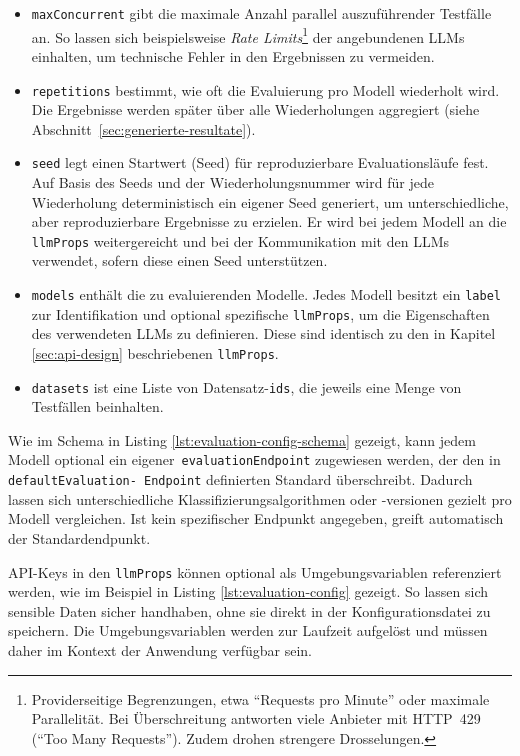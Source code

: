 \begin{itemize}
    \item \texttt{maxConcurrent} gibt die maximale Anzahl parallel auszuführender Testfälle an. So lassen sich beispielsweise \emph{Rate Limits}\footnote{Providerseitige Begrenzungen, etwa \enquote{Requests pro Minute} oder maximale Parallelität. Bei Überschreitung antworten viele Anbieter mit HTTP~429 (\enquote{Too Many Requests}). Zudem drohen strengere Drosselungen.} der angebundenen \acp{LLM} einhalten, um technische Fehler in den Ergebnissen zu vermeiden.
    \item \texttt{repetitions} bestimmt, wie oft die Evaluierung pro Modell wiederholt wird. Die Ergebnisse werden später über alle Wiederholungen aggregiert (siehe Abschnitt~\ref{sec:generierte-resultate}).
    \item \texttt{seed} legt einen Startwert (Seed) für reproduzierbare Evaluationsläufe fest. Auf Basis des Seeds und der Wiederholungsnummer wird für jede Wiederholung deterministisch ein eigener Seed generiert, um unterschiedliche, aber reproduzierbare Ergebnisse zu erzielen. Er wird bei jedem Modell an die \texttt{llmProps} weitergereicht und bei der Kommunikation mit den \acp{LLM} verwendet, sofern diese einen Seed unterstützen.
    \item \texttt{models} enthält die zu evaluierenden Modelle. Jedes Modell besitzt ein \texttt{label} zur Identifikation und optional spezifische \texttt{llmProps}, um die Eigenschaften des verwendeten \acp{LLM} zu definieren. Diese sind identisch zu den in Kapitel \ref{sec:api-design} beschriebenen \texttt{llmProps}.
    \item \texttt{datasets} ist eine Liste von Datensatz-\texttt{ids}, die jeweils eine Menge von Testfällen beinhalten.
\end{itemize}

Wie im Schema in Listing \ref{lst:evaluation-config-schema} gezeigt, kann jedem Modell optional ein eigener\linebreak~\texttt{evaluationEndpoint} zugewiesen werden, der den in \texttt{defaultEvaluation-\linebreak~Endpoint} definierten Standard überschreibt. Dadurch lassen sich unterschiedliche Klassifizierungsalgorithmen oder -versionen gezielt pro Modell vergleichen. Ist kein spezifischer Endpunkt angegeben, greift automatisch der Standardendpunkt.

API-Keys in den \texttt{llmProps} können optional als Umgebungsvariablen referenziert werden, wie im Beispiel in Listing \ref{lst:evaluation-config} gezeigt. So lassen sich sensible Daten sicher handhaben, ohne sie direkt in der Konfigurationsdatei zu speichern. Die Umgebungsvariablen werden zur Laufzeit aufgelöst und müssen daher im Kontext der Anwendung verfügbar sein.